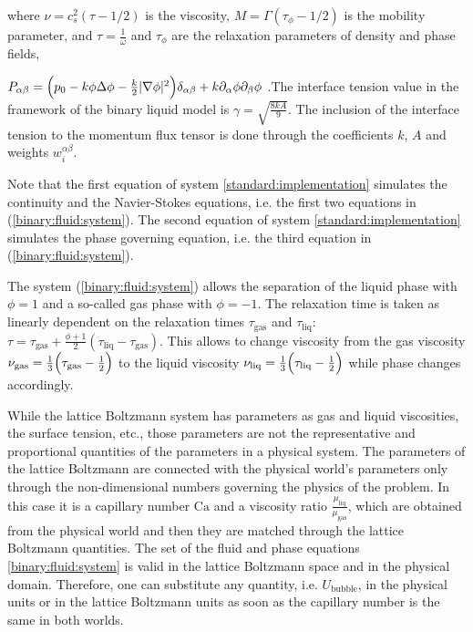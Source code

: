 \documentclass[preprint,12pt]{elsarticle}
\newcommand{\Ca}{\mathrm{Ca}}
\begin{document}
where $\nu=c_s^2 (\tau-1/2)$ is the viscosity,
$M=\Gamma(\tau_{\phi}-1/2)$ is the mobility parameter, and $\tau=\frac{1}{\omega}$ and $\tau_{\phi}$
are the relaxation parameters of density and phase fields, {\color{red}
$P_{\alpha\beta}=\Bigl(p_0-k\phi \Delta \phi -\frac{k}{2}|\nabla \phi|^2\Bigr)\delta_{\alpha\beta}
+ k \partial_{\alpha} \phi \partial_{\beta} \phi$  \cite{pooley-contact}.The interface tension value
in the framework of the binary liquid model is $\gamma=\sqrt{\frac{8 k
A}{9}}$. The inclusion of the interface tension to the momentum flux tensor is done through the
coefficients $k$, $A$ and weights $w_i^{\alpha\beta}$.

Note that the first equation of system \ref{standard:implementation} simulates the continuity and
the Navier-Stokes equations, i.e. the first two equations in (\ref{binary:fluid:system}). The second
equation
of system \ref{standard:implementation} simulates the phase governing equation, i.e. the third
equation in
(\ref{binary:fluid:system}).} The system (\ref{binary:fluid:system}) allows the separation of the
liquid
phase with $\phi=1$ and a so-called gas phase with $\phi=-1$. The
relaxation time is taken as linearly dependent on the relaxation
times $\tau_{\mathrm{gas}}$ and $\tau_{\mathrm{liq}}$:
$\tau=\tau_{\mathrm{gas}}+\frac{\phi+1}{2}(\tau_{\mathrm{liq}}-\tau_{\mathrm{gas}})$. This allows
to change viscosity from the gas viscosity
$\nu_{\mathrm{gas}}=\frac{1}{3}\Bigl(\tau_{\mathrm{gas}}-\frac{1}{2}\Bigr)$ to the liquid viscosity
$\nu_{\mathrm{liq}}=\frac{1}{3}\Bigl(\tau_{\mathrm{liq}}-\frac{1}{2}\Bigr)$ while phase changes
accordingly.

{\color{red}
While the lattice Boltzmann system has parameters as gas and liquid
viscosities, the surface tension, etc., those parameters are not the representative and
proportional quantities of the parameters in a physical system. The parameters of the lattice
Boltzmann are connected with the physical world's parameters only through the non-dimensional
numbers governing the physics of the problem. In this case it is a capillary number $\Ca$ and a
viscosity ratio $\frac{\mu_{\mathrm{liq}}}{\mu_{\mathrm{gas}}}$, which are
obtained from the physical world and then they are matched through the lattice Boltzmann quantities.
 The set of
the fluid and phase equations \eqref{binary:fluid:system} is valid in the lattice Boltzmann space
and in the physical domain. Therefore, one can substitute any quantity, i.e.
$U_{\mathrm{bubble}}$, in the physical units or in the lattice Boltzmann units as soon as the
capillary number is the same in both worlds.} 
\end{document}
